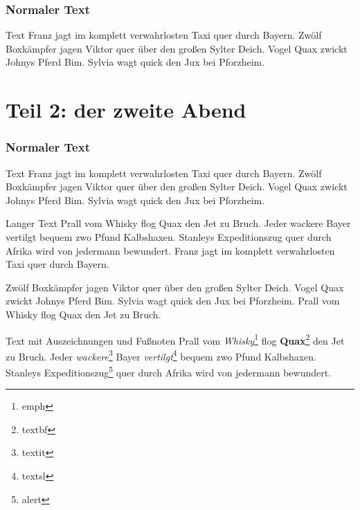 \documentclass[t, aspectratio=169, ngerman]{beamer}
\begin{document}
	\frame{\partpage}

	\section{Normaler Text}

	\begin{frame}{Text}
		Franz jagt im komplett verwahrlosten Taxi quer durch Bayern.
		Zwölf Boxkämpfer jagen Viktor quer über den großen Sylter Deich.
		Vogel Quax zwickt Johnys Pferd Bim.
		Sylvia wagt quick den Jux bei Pforzheim.
	\end{frame}






	\part{Teil 2: der zweite Abend}

	\frame{\partpage}

	\section{Normaler Text}

	\begin{frame}{Text}
		Franz jagt im komplett verwahrlosten Taxi quer durch Bayern.
		Zwölf Boxkämpfer jagen Viktor quer über den großen Sylter Deich.
		Vogel Quax zwickt Johnys Pferd Bim.
		Sylvia wagt quick den Jux bei Pforzheim.
	\end{frame}

	\begin{frame}{Langer Text}
		Prall vom Whisky flog Quax den Jet zu Bruch.
		Jeder wackere Bayer vertilgt bequem zwo Pfund Kalbshaxen.
		Stanleys Expeditionszug quer durch Afrika wird von jedermann bewundert.
		Franz jagt im komplett verwahrlosten Taxi quer durch Bayern.

		Zwölf Boxkämpfer jagen Viktor quer über den großen Sylter Deich.
		Vogel Quax zwickt Johnys Pferd Bim.
		Sylvia wagt quick den Jux bei Pforzheim.
		Prall vom Whisky flog Quax den Jet zu Bruch.
	\end{frame}

	\begin{frame}{Text mit Auszeichnungen und Fußnoten}
		Prall vom \emph{Whisky}\footnote{emph} flog \textbf{Quax}\footnote{textbf} den Jet zu Bruch.
		Jeder \textit{wackere}\footnote{textit} Bayer \textsl{vertilgt}\footnote{textsl} bequem zwo Pfund Kalbshaxen.
		Stanleys \alert{Expeditionszug}\footnote{alert} quer durch Afrika wird von jedermann bewundert.
	\end{frame}
\end{document}
